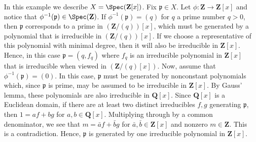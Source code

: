 \begin{example}
\label{example-spec-Zx}
In this example we describe $X = \Spec(\mathbf{Z}[x])$.
Fix $\mathfrak p \in X$.
Let $\phi : \mathbf{Z} \to \mathbf{Z}[x]$ and notice
that $\phi^{-1}(\mathfrak p) \in \Spec(\mathbf{Z})$.
If $\phi^{-1}(\mathfrak p) = (q)$ for $q$ a prime number $q > 0$,
then $\mathfrak p$ corresponds to a prime in $(\mathbf{Z}/(q))[x]$,
which must be generated by a polynomial that is irreducible in
$(\mathbf{Z}/(q))[x]$.   If we choose a representative of this polynomial
with minimal degree, then it will also be irreducible in $\mathbf{Z}[x]$.
Hence, in this case $\mathfrak p = (q, f_q)$ where $f_q$ is an irreducible
polynomial in $\mathbf{Z}[x]$ that is irreducible when viewed
in $(\mathbf{Z}/(q) [x])$. Now, assume that $\phi^{-1}(\mathfrak p) = (0)$.
In this case, $\mathfrak p$ must be generated by nonconstant polynomials
which, since $\mathfrak p$ is prime, may be assumed to be irreducible in
$\mathbf{Z}[x]$.  By Gauss' lemma, these polynomials are also irreducible
in $\mathbf{Q}[x]$.  Since $\mathbf{Q}[x]$ is a Euclidean domain, if there
are at least two distinct irreducibles $f, g$ generating $\mathfrak p$,
then $1 = af + bg$ for $a, b \in \mathbf{Q}[x]$.  Multiplying through by
a common denominator, we see that $m = \bar{a}f + \bar{b} g$ for
$\bar{a}, \bar{b} \in \mathbf{Z}[x]$ and nonzero $m \in \mathbf{Z}$.
This is a contradiction.  Hence, $\mathfrak p$ is generated by one
irreducible polynomial in $\mathbf{Z}[x]$.
\end{example}